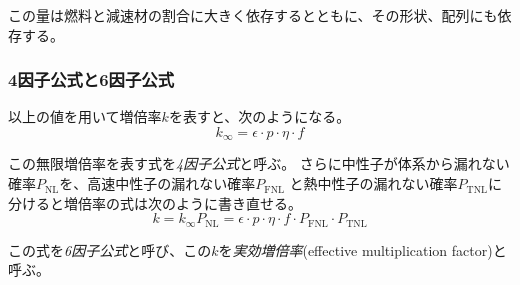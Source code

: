この量は燃料と減速材の割合に大きく依存するとともに、その形状、配列にも依存する。

\subsubsection{4因子公式と6因子公式}
以上の値を用いて増倍率$k$を表すと、次のようになる。
\begin{equation}
  k_\infty = \epsilon \cdot p \cdot \eta \cdot f
\end{equation}

この無限増倍率を表す式を\emph{4因子公式}と呼ぶ。
さらに中性子が体系から漏れない確率$P_\text{NL}$を、高速中性子の漏れない確率$P_\text{FNL}$
と熱中性子の漏れない確率$P_\text{TNL}$に分けると増倍率の式は次のように書き直せる。
\begin{equation}
  k = k_\infty P_\text{NL} =\epsilon \cdot p \cdot \eta \cdot f
\cdot P_\text{FNL} \cdot P_\text{TNL}
\end{equation}

この式を\emph{6因子公式}と呼び、この$k$を\emph{実効増倍率}(effective multiplication factor)と呼ぶ。

\printbibliography[segment=\therefsegment,heading=subbibliography]

\newpage
